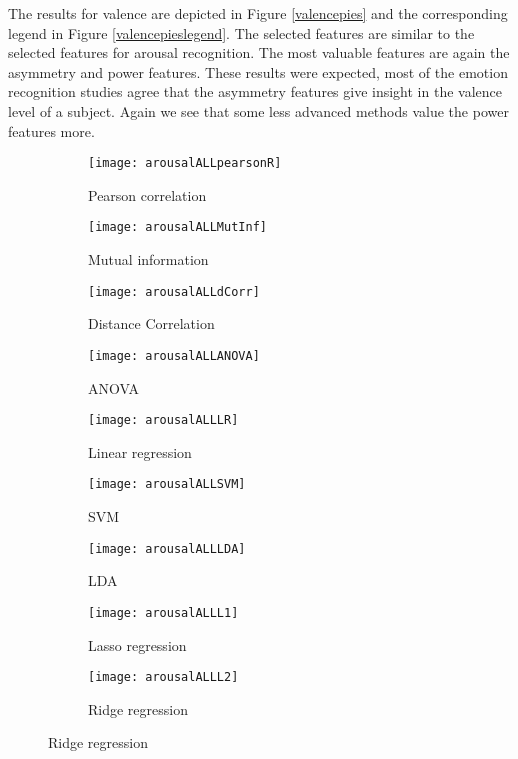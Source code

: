 \npar

The results for valence are depicted in Figure \ref{valencepies} and the corresponding legend in Figure \ref{valencepieslegend}. The selected features are similar to the selected features for arousal recognition. The most valuable features are again the asymmetry and power features. These results were expected, most of the emotion recognition studies agree that the asymmetry features give insight in the valence level of a subject. Again we see that some less advanced methods value the power features more.

\clearpage
\begin{figure}[!tbp]
  \centering
  \caption{Selection features for arousal classification.\label{arousalpies}}
  \begin{subfigure}[b]{0.3\textwidth}
    \texttt{[image: arousalALLpearsonR]}
    \caption{Pearson correlation}
  \end{subfigure}
  \hfill
  \begin{subfigure}[b]{0.3\textwidth}
    \texttt{[image: arousalALLMutInf]}
    \caption{Mutual information}
  \end{subfigure}
  \hfill
  \begin{subfigure}[b]{0.3\textwidth}
    \texttt{[image: arousalALLdCorr]}
    \caption{Distance Correlation}
  \end{subfigure}
  
  \begin{subfigure}[b]{0.3\textwidth}
    \texttt{[image: arousalALLANOVA]}
    \caption{ANOVA}
  \end{subfigure}
  \hfill
  \begin{subfigure}[b]{0.3\textwidth}
    \texttt{[image: arousalALLLR]}
    \caption{Linear regression}
  \end{subfigure}
  \hfill
  \begin{subfigure}[b]{0.3\textwidth}
    \texttt{[image: arousalALLSVM]}
    \caption{SVM}
  \end{subfigure}
  
  \begin{subfigure}[b]{0.3\textwidth}
    \texttt{[image: arousalALLLDA]}
    \caption{LDA}
  \end{subfigure}
  \hfill
  \begin{subfigure}[b]{0.3\textwidth}
    \texttt{[image: arousalALLL1]}
    \caption{Lasso regression}
  \end{subfigure}
  \hfill
  \begin{subfigure}[b]{0.3\textwidth}
    \texttt{[image: arousalALLL2]}
    \caption{Ridge regression}
  \end{subfigure}
  

\end{figure}
